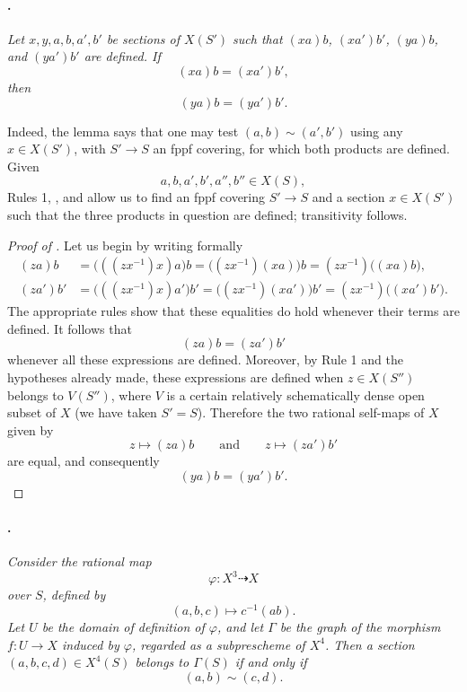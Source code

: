 \paragraph{.}
\textit{Let \(x,y,a,b,a',b'\) be sections of \(X(S')\) such that
\((xa)b\), \((xa')b'\), \((ya)b\), and \((ya')b'\) are defined. If
\[
  (xa)b=(xa')b',
\]
then
\[
  (ya)b=(ya')b'.
\]}

Indeed, the lemma says that one may test
\((a,b)\sim(a',b')\) using any \(x\in X(S')\), with
\(S'\to S\) an fppf covering, for which both products are defined.
Given
\[
  a,b,a',b',a'',b''\in X(S),
\]
Rules 1, , and  allow us to find an fppf covering
\(S'\to S\) and a section \(x\in X(S')\) such that the three
products in question are defined; transitivity follows.

\begin{proof}[Proof of ]
Let us begin by writing formally
\[
\begin{aligned}
  (za)b
  &=\bigl(((zx^{-1})x)a\bigr)b
   =\bigl((zx^{-1})(xa)\bigr)b
   =(zx^{-1})\bigl((xa)b\bigr),\\
  (za')b'
  &=\bigl(((zx^{-1})x)a'\bigr)b'
   =\bigl((zx^{-1})(xa')\bigr)b'
   =(zx^{-1})\bigl((xa')b'\bigr).
\end{aligned}
\]
The appropriate rules show that these equalities do hold whenever
their terms are defined. It follows that
\[
  (za)b=(za')b'
\]
whenever all these expressions are defined. Moreover, by Rule 1
and the hypotheses already made, these expressions are defined
when \(z\in X(S'')\) belongs to \(V(S'')\), where \(V\) is a
certain relatively schematically dense open subset of \(X\) (we
have taken \(S'=S\)). Therefore the two rational self-maps of
\(X\) given by
\[
  z\longmapsto(za)b
  \qquad\text{and}\qquad
  z\longmapsto(za')b'
\]
are equal, and consequently
\[
  (ya)b=(ya')b'.
\]
\end{proof}

\paragraph{.}
\textit{Consider the rational map
\[
  \varphi\colon X^3\dashrightarrow X
\]
over \(S\), defined by
\[
  (a,b,c)\longmapsto c^{-1}(ab).
\]
Let \(U\) be the domain of definition of \(\varphi\), and let
\(\Gamma\) be the graph of the morphism \(f\colon U\to X\)
induced by \(\varphi\), regarded as a subprescheme of \(X^4\).
Then a section \((a,b,c,d)\in X^4(S)\) belongs to \(\Gamma(S)\)
if and only if
\[
  (a,b)\sim(c,d).
\]}

